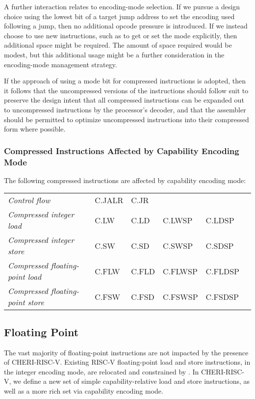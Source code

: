 A further interaction relates to encoding-mode selection.
If we pursue a design choice using the lowest bit of a target jump address to
set the encoding used following a jump, then no additional opcode pressure is
introduced.
If we instead choose to use new instructions, such as to get or set the mode
explicitly, then additional space might be required.
The amount of space required would be modest, but this additional usage might
be a further consideration in the encoding-mode management strategy.

If the approach of using a mode bit for compressed instructions is
adopted, then it follows that the uncompressed versions of the
instructions should follow suit to preserve the design intent that
all compressed instructions can be expanded out to uncompressed
instructions by the processor's decoder, and that the assembler should
be permitted to optimize uncompressed instructions into their
compressed form where possible.

\subsubsection{Compressed Instructions Affected by Capability Encoding Mode}

The following compressed instructions are affected by capability encoding
mode:

\medskip

\begin{tabular}{llllll}
\textit{Control flow} & C.JALR & C.JR & & \\
\textit{Compressed integer load} & C.LW & C.LD & C.LWSP & C.LDSP & \\
\textit{Compressed integer store} & C.SW & C.SD & C.SWSP & C.SDSP & \\
\textit{Compressed floating-point load} & C.FLW & C.FLD & C.FLWSP & C.FLDSP & \\
\textit{Compressed floating-point store} & C.FSW & C.FSD & C.FSWSP & C.FSDSP & \\
\end{tabular}

\subsection{Floating Point}

The vast majority of floating-point instructions are not impacted by the
presence of CHERI-RISC-V.
Existing RISC-V floating-point load and store instructions, in the
integer encoding mode, are relocated and constrained by \DDC{}.
In CHERI-RISC-V, we define a new set of simple capability-relative load and
store instructions, as well as a more rich set via capability encoding mode.


